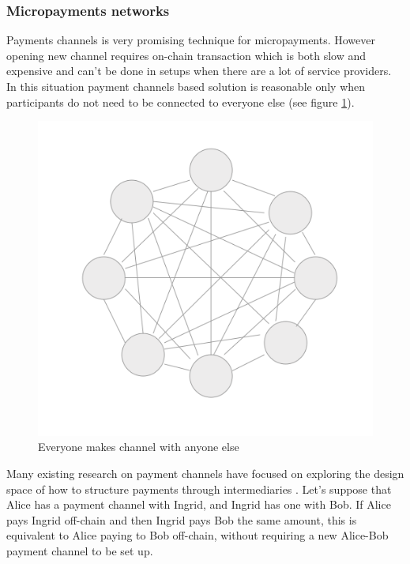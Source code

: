 \documentclass[a4paper,12pt]{article}
\begin{document}
\subsubsection{Micropayments networks}

Payments channels is very promising technique for micropayments. However opening 
new channel requires on-chain transaction which is both slow and expensive and 
can't be done in setups when there are a lot of service providers. In this 
situation payment channels based solution is reasonable only when participants 
do not need to be connected to everyone else (see figure \ref{img:many-to-many}). 

\begin{figure}[H]
    \centering
    \includegraphics[scale=0.5]{../img/many-to-many}
    \caption{Everyone makes channel with anyone else}
    \label{img:many-to-many}
\end{figure}

Many existing research on payment channels have focused on exploring the design
space of how to structure payments through intermediaries \cite{counterfactual, 
perun, lightning}. Let's suppose that Alice has a payment channel with Ingrid, and 
Ingrid has one with Bob. If Alice pays Ingrid off-chain and then Ingrid pays Bob 
the same amount, this is equivalent to Alice paying to Bob off-chain, without 
requiring a new Alice-Bob payment channel to be set up.
\end{document}

